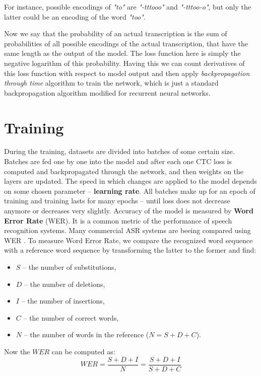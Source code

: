 \documentclass[licencjacka,en]{pracamgr}
\begin{document}
For instance, possible encodings of \textit{"to"} are \textit{"-tttooo"} and \textit{"-tttoo-o"}, but only the latter could be an encoding of the word \textit{"too"}.

Now we say that the probability of an actual transcription is the sum of probabilities of all possible encodings of the actual transcription, that have the same length as the output of the model. The loss function here is simply the negative logarithm of this probability. Having this we can count derivatives of this loss function with respect to model output and then apply \textit{backpropagation through time} algorithm to train the network, which is just a standard backpropagation algorithm modified for recurrent neural networks.

\section{Training} \label{sec:trainig}
During the training, datasets are divided into batches of some certain size. Batches are fed one by one into the model and after each one CTC loss is computed and backpropagated through the network, and then weights on the layers are updated. The speed in which changes are applied to the model depends on some chosen parameter -- \textbf{learning rate}. All batches make up for an epoch of training and training lasts for many epochs -- until loss does not decrease anymore or decreases very slightly.
Accuracy of the model is measured by \textbf{Word Error Rate} (WER). It is a common metric of the performance of speech recognition systems. Many commercial ASR systems are beeing compared using WER \cite{DS8}. To measure Word Error Rate, we compare the recognized word sequence with a reference word sequence by transforming the latter to the former and find:

\begin{itemize}
  \item $S$ -- the number of substitutions,
  \item $D$ -- the number of deletions,
  \item $I$ -- the number of insertions,
  \item $C$ -- the number of correct words,
  \item $N$ -- the number of words in the reference ($N=S+D+C$).
\end{itemize}
Now the $WER$ can be computed as:
$$
WER = \frac{S + D + I}{N} = \frac{S + D + I}{S + D + C}
$$
\end{document}
